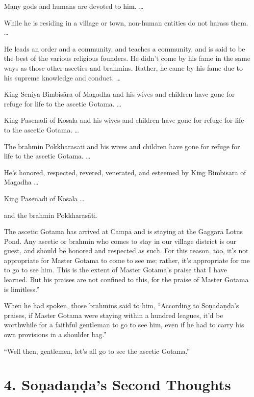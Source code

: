\documentclass[12pt,openany]{book}%
\begin{document}
Many gods and humans are devoted to him. … 

While he is residing in a village or town, non-human entities do not harass them. … 

He leads an order and a community, and teaches a community, and is said to be the best of the various religious founders. He didn’t come by his fame in the same ways as those other ascetics and brahmins. Rather, he came by his fame due to his supreme knowledge and conduct. … 

King Seniya \textsanskrit{Bimbisāra} of Magadha and his wives and children have gone for refuge for life to the ascetic Gotama. … 

King Pasenadi of Kosala and his wives and children have gone for refuge for life to the ascetic Gotama. … 

The brahmin \textsanskrit{Pokkharasāti} and his wives and children have gone for refuge for life to the ascetic Gotama. … 

He’s honored, respected, revered, venerated, and esteemed by King \textsanskrit{Bimbisāra} of Magadha … 

King Pasenadi of Kosala … 

and the brahmin \textsanskrit{Pokkharasāti}. 

The ascetic Gotama has arrived at \textsanskrit{Campā} and is staying at the \textsanskrit{Gaggarā} Lotus Pond. Any ascetic or brahmin who comes to stay in our village district is our guest, and should be honored and respected as such. For this reason, too, it’s not appropriate for Master Gotama to come to see me; rather, it’s appropriate for me to go to see him. This is the extent of Master Gotama’s praise that I have learned. But his praises are not confined to this, for the praise of Master Gotama is limitless.” 

When he had spoken, those brahmins said to him, “According to \textsanskrit{Soṇadaṇḍa}’s praises, if Master Gotama were staying within a hundred leagues, it’d be worthwhile for a faithful gentleman to go to see him, even if he had to carry his own provisions in a shoulder bag.” 

“Well then, gentlemen, let’s all go to see the ascetic Gotama.” 

\section*{4. \textsanskrit{Soṇadaṇḍa}’s Second Thoughts }
\end{document}

